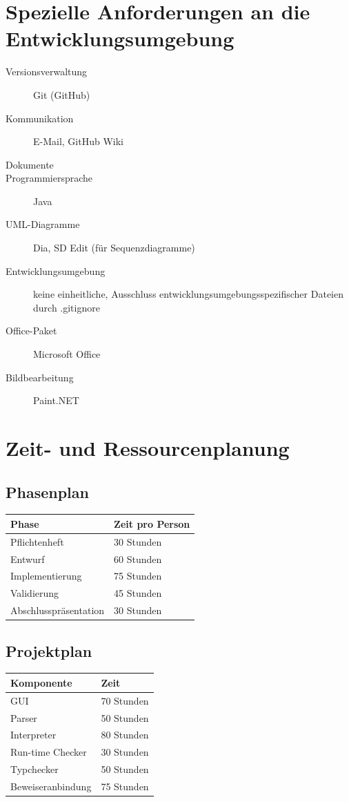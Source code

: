 \documentclass[a4paper,10pt]{article}
\begin{document}
\section{Spezielle Anforderungen an die Entwicklungsumgebung}
\begin{description}
  \item[Versionsverwaltung] Git (GitHub)
  \item[Kommunikation] E-Mail, GitHub Wiki
  \item[Dokumente] \LaTeXe
  \item[Programmiersprache] Java
  \item[UML-Diagramme] Dia, SD Edit (f\"{u}r Sequenzdiagramme)
  \item[Entwicklungsumgebung] keine einheitliche, Ausschluss entwicklungsumgebungsspezifischer Dateien durch .gitignore
  \item[Office-Paket] Microsoft Office
  \item[Bildbearbeitung] Paint.NET
\end{description}


\section{Zeit- und Ressourcenplanung}
\subsection{Phasenplan}
\begin{tabular}[h]{| l | l |}
\hline
\textbf{Phase} & \textbf{Zeit pro Person}\\
\hline
Pflichtenheft & 30 Stunden\\
Entwurf & 60 Stunden\\
Implementierung & 75 Stunden\\
Validierung & 45 Stunden\\
Abschlusspr\"{a}sentation & 30 Stunden\\
\hline
\end{tabular}

\subsection{Projektplan}
\begin{tabular}[h]{| l | l |}
\hline
\textbf{Komponente} & \textbf{Zeit}\\
\hline
GUI & 70 Stunden\\
Parser & 50 Stunden\\
Interpreter & 80 Stunden\\
Run-time Checker & 30 Stunden\\
Typchecker & 50 Stunden\\
Beweiseranbindung & 75 Stunden\\
\hline
\end{tabular}
\end{document}
